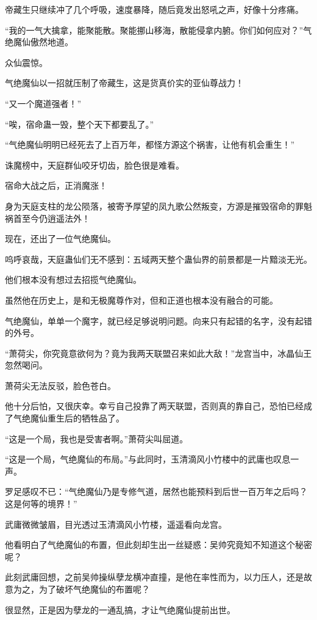 \begin{this_body}
帝藏生只继续冲了几个呼吸，速度暴降，随后竟发出怒吼之声，好像十分疼痛。

“我的一气大擒拿，能聚能散。聚能挪山移海，散能侵拿内腑。你们如何应对？”气绝魔仙傲然地道。

众仙震惊。

气绝魔仙以一招就压制了帝藏生，这是货真价实的亚仙尊战力！

“又一个魔道强者！”

“唉，宿命蛊一毁，整个天下都要乱了。”

“气绝魔仙明明已经死去了上百万年，都怪方源这个祸害，让他有机会重生！”

诛魔榜中，天庭群仙咬牙切齿，脸色很是难看。

宿命大战之后，正消魔涨！

身为天庭支柱的龙公陨落，被寄予厚望的凤九歌公然叛变，方源是摧毁宿命的罪魁祸首至今仍逍遥法外！

现在，还出了一位气绝魔仙。

呜呼哀哉，天庭蛊仙们无不感到：五域两天整个蛊仙界的前景都是一片黯淡无光。

他们根本没有想过去招揽气绝魔仙。

虽然他在历史上，是和无极魔尊作对，但和正道也根本没有融合的可能。

气绝魔仙，单单一个魔字，就已经足够说明问题。向来只有起错的名字，没有起错的外号。

“萧荷尖，你究竟意欲何为？竟为我两天联盟召来如此大敌！”龙宫当中，冰晶仙王忽然喝问。

萧荷尖无法反驳，脸色苍白。

他十分后怕，又很庆幸。幸亏自己投靠了两天联盟，否则真的靠自己，恐怕已经成了气绝魔仙重生后的牺牲品了。

“这是一个局，我也是受害者啊。”萧荷尖叫屈道。

“这是一个局，气绝魔仙的布局。”与此同时，玉清滴风小竹楼中的武庸也叹息一声。

罗足感叹不已：“气绝魔仙乃是专修气道，居然也能预料到后世一百万年之后吗？这是何等的境界！”

武庸微微皱眉，目光透过玉清滴风小竹楼，遥遥看向龙宫。

他看明白了气绝魔仙的布置，但此刻却生出一丝疑惑：吴帅究竟知不知道这个秘密呢？

此刻武庸回想，之前吴帅操纵孽龙横冲直撞，是他在率性而为，以力压人，还是故意为之，为了破坏气绝魔仙的布置呢？

很显然，正是因为孽龙的一通乱搞，才让气绝魔仙提前出世。


\end{this_body}
